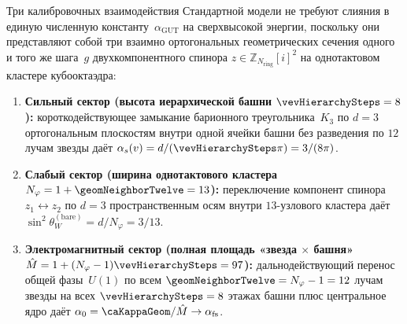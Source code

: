 \begin{theorem}
\label{thm:three-interaction-sectors}
Три калибровочных взаимодействия Стандартной модели не требуют слияния в единую численную константу~$\alpha_{\mathrm{GUT}}$ на сверхвысокой энергии, поскольку они представляют собой три взаимно ортогональных геометрических сечения одного и того же шага~$g$ двухкомпонентного спинора $z\in\mathbb{Z}_{N_{\mathrm{ring}}}[i]^2$ на однотактовом кластере кубооктаэдра:
\begin{enumerate}[noitemsep]
\item \textbf{Сильный сектор (высота иерархической башни $\vevHierarchySteps = 8$):}
  короткодействующее замыкание барионного треугольника~$K_3$ по $d=3$ ортогональным плоскостям внутри одной ячейки башни без разведения по $12$ лучам звезды даёт $\alpha_s(v) = d/(\vevHierarchySteps\pi) = 3/(8\pi)$.
\item \textbf{Слабый сектор (ширина однотактового кластера $N_\varphi = 1 + \geomNeighborTwelve = 13$):}
  переключение компонент спинора $z_1\leftrightarrow z_2$ по $d=3$ пространственным осям внутри $13$-узлового кластера даёт $\sin^2\theta_W^{(\mathrm{bare})} = d/N_\varphi = 3/13$.
\item \textbf{Электромагнитный сектор (полная площадь «звезда $\times$ башня» $\hat M = 1 + (N_\varphi - 1)\vevHierarchySteps = 97$):}
  дальнодействующий перенос общей фазы~$U(1)$ по всем $\geomNeighborTwelve = N_\varphi - 1 = 12$ лучам звезды на всех $\vevHierarchySteps = 8$ этажах башни плюс центральное ядро даёт $\alpha_0 = \caKappaGeom/\hat M \to \alpha_{\mathrm{fs}}$.
\end{enumerate}
\end{theorem}

